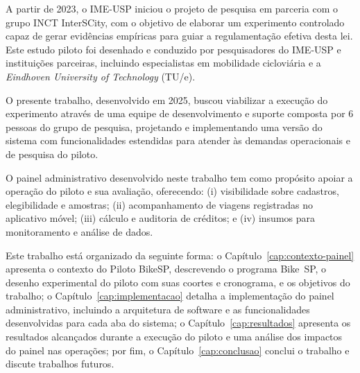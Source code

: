 A partir de 2023, o IME-USP iniciou o projeto de pesquisa em parceria com o
grupo INCT InterSCity, com o objetivo de elaborar um experimento controlado
capaz de gerar evidências empíricas para guiar a regulamentação efetiva desta
lei. Este estudo piloto foi desenhado e conduzido por pesquisadores do IME-USP
e instituições parceiras, incluindo especialistas em mobilidade cicloviária e a
\emph{Eindhoven University of Technology} (TU/e).

O presente trabalho, desenvolvido em 2025, buscou viabilizar a execução do
experimento através de uma equipe de desenvolvimento e
suporte composta por 6 pessoas do grupo de pesquisa, projetando e implementando
uma versão do sistema com funcionalidades estendidas para atender às
demandas operacionais e de pesquisa do piloto.

O painel administrativo desenvolvido neste trabalho tem como propósito apoiar a
operação do piloto e sua avaliação, oferecendo: (i) visibilidade sobre
cadastros, elegibilidade e amostras; (ii) acompanhamento de viagens registradas
no aplicativo móvel; (iii) cálculo e auditoria de créditos; e (iv) insumos para
monitoramento e análise de dados.

Este trabalho está organizado da seguinte forma: o Capítulo~\ref{cap:contexto-painel} apresenta o contexto do Piloto BikeSP, descrevendo o programa Bike~SP, o desenho experimental do piloto com suas coortes e cronograma, e os objetivos do trabalho; o Capítulo~\ref{cap:implementacao} detalha a implementação do painel administrativo, incluindo a arquitetura de software e as funcionalidades desenvolvidas para cada aba do sistema; o Capítulo~\ref{cap:resultados} apresenta os resultados alcançados durante a execução do piloto e uma análise dos impactos do painel nas operações; por fim, o Capítulo~\ref{cap:conclusao} conclui o trabalho e discute trabalhos futuros.



